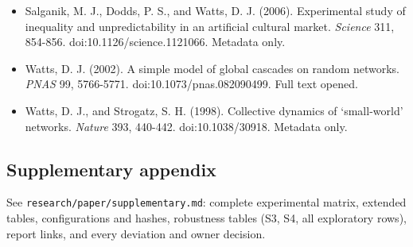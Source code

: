 \documentclass[
]{article}
\begin{document}
\begin{itemize}
  Pastor-Satorras, R., Castellano, C., Van Mieghem, P., and Vespignani,
  A. (2015). Epidemic processes in complex networks. \emph{Reviews of
  Modern Physics} 87, 925-979. doi:10.1103/RevModPhys.87.925. Abstract
  and section IV.C read (arXiv preprint; identifier in references.bib).
\item
  Salganik, M. J., Dodds, P. S., and Watts, D. J. (2006). Experimental
  study of inequality and unpredictability in an artificial cultural
  market. \emph{Science} 311, 854-856. doi:10.1126/science.1121066.
  Metadata only.
\item
  Watts, D. J. (2002). A simple model of global cascades on random
  networks. \emph{PNAS} 99, 5766-5771. doi:10.1073/pnas.082090499. Full
  text opened.
\item
  Watts, D. J., and Strogatz, S. H. (1998). Collective dynamics of
  `small-world' networks. \emph{Nature} 393, 440-442. doi:10.1038/30918.
  Metadata only.
\end{itemize}

\subsection{Supplementary appendix}\label{supplementary-appendix}

See \texttt{research/paper/supplementary.md}: complete experimental
matrix, extended tables, configurations and hashes, robustness tables
(S3, S4, all exploratory rows), report links, and every deviation and
owner decision.
\end{document}
